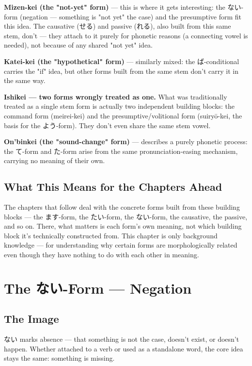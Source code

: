 \documentclass[12pt]{book}
\begin{document}
\textbf{Mizen-kei (the "not-yet" form)} — this is where it gets interesting: the ない-form (negation — something is "not yet" the case) and the presumptive form fit this idea. The causative (せる) and passive (れる), also built from this same stem, don't — they attach to it purely for phonetic reasons (a connecting vowel is needed), not because of any shared "not yet" idea.

\textbf{Katei-kei (the "hypothetical" form)} — similarly mixed: the ば-conditional carries the "if" idea, but other forms built from the same stem don't carry it in the same way.

\textbf{Ishikei — two forms wrongly treated as one.} What was traditionally treated as a single stem form is actually two independent building blocks: the command form (meirei-kei) and the presumptive/volitional form (suiryō-kei, the basis for the よう-form). They don't even share the same stem vowel.

\textbf{On'binkei (the "sound-change" form)} — describes a purely phonetic process: the て-form and た-form arise from the same pronunciation-easing mechanism, carrying no meaning of their own.

\section*{What This Means for the Chapters Ahead}

The chapters that follow deal with the concrete forms built from these building blocks — the ます-form, the たい-form, the ない-form, the causative, the passive, and so on. There, what matters is each form's own meaning, not which building block it's technically constructed from. This chapter is only background knowledge — for understanding why certain forms are morphologically related even though they have nothing to do with each other in meaning.


\chapter{The ない-Form — Negation}

\section*{The Image}

ない marks absence — that something is not the case, doesn't exist, or doesn't happen. Whether attached to a verb or used as a standalone word, the core idea stays the same: something is missing.
\end{document}
